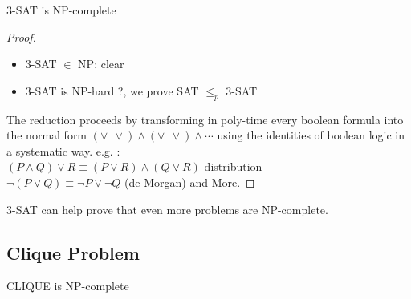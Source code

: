 \begin{theorem}
3-SAT is NP-complete
\end{theorem}
\begin{proof}
\begin{itemize}
\item 3-SAT $\in$ NP: clear
\item 3-SAT is NP-hard ?, we prove SAT $\leq_p$ 3-SAT
\end{itemize}

The reduction proceeds by transforming in poly-time every boolean formula into the normal form $( \vee \ \ \vee ) \wedge ( \vee \ \ \vee) \wedge \cdots$ using the identities of boolean logic in a systematic way. e.g. : \\
$(P \wedge Q) \vee R \equiv (P \vee R) \wedge (Q \vee R)$ distribution \\
$ \neg (P \vee Q) \equiv \neg P \vee \neg Q$ (de Morgan) and More. 
\end{proof}

3-SAT can help prove that even more problems are NP-complete. 

\subsection{Clique Problem}

\begin{theorem}
CLIQUE is NP-complete
\end{theorem}

